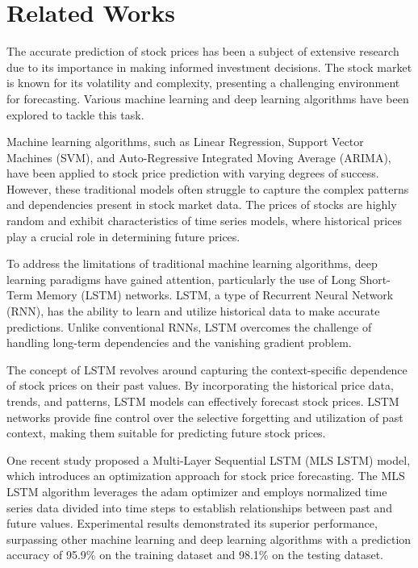 \documentclass[conference]{IEEEtran}
\begin{document}
\section{Related Works}
The accurate prediction of stock prices has been a subject of extensive research due to its importance in making informed investment decisions. The stock market is known for its volatility and complexity, presenting a challenging environment for forecasting. Various machine learning and deep learning algorithms have been explored to tackle this task.

Machine learning algorithms, such as Linear Regression, Support Vector Machines (SVM), and Auto-Regressive Integrated Moving Average (ARIMA), have been applied to stock price prediction with varying degrees of success. However, these traditional models often struggle to capture the complex patterns and dependencies present in stock market data. The prices of stocks are highly random and exhibit characteristics of time series models, where historical prices play a crucial role in determining future prices.

To address the limitations of traditional machine learning algorithms, deep learning paradigms have gained attention, particularly the use of Long Short-Term Memory (LSTM) networks\cite{ieee}. LSTM, a type of Recurrent Neural Network (RNN), has the ability to learn and utilize historical data to make accurate predictions. Unlike conventional RNNs, LSTM overcomes the challenge of handling long-term dependencies and the vanishing gradient problem.

The concept of LSTM revolves around capturing the context-specific dependence of stock prices on their past values. By incorporating the historical price data, trends, and patterns, LSTM models can effectively forecast stock prices. LSTM networks provide fine control over the selective forgetting and utilization of past context, making them suitable for predicting future stock prices.

One recent study proposed a Multi-Layer Sequential LSTM (MLS LSTM) model, which introduces an optimization approach for stock price forecasting. The MLS LSTM algorithm leverages the adam optimizer and employs normalized time series data divided into time steps to establish relationships between past and future values. Experimental results demonstrated its superior performance, surpassing other machine learning and deep learning algorithms with a prediction accuracy of 95.9\% on the training dataset and 98.1\% on the testing dataset\cite{sd}.
\end{document}
